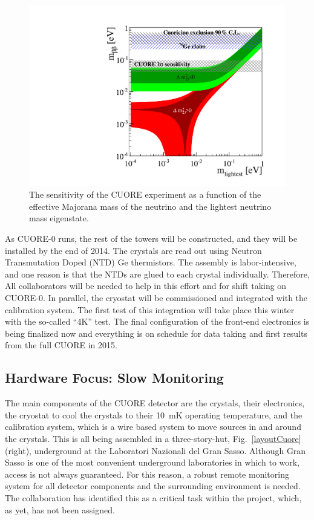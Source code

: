 \begin{figure}
\begin{center}
\includegraphics[width=0.45\columnwidth]{CUORE_Sensitivity.pdf} 
\end{center}
\caption{\label{sensCUORE}The sensitivity of the CUORE experiment as a function of the effective Majorana mass of the neutrino and the lightest neutrino mass eigenstate\cite{Alessandria:2011rc}. }
\end{figure}

As CUORE-0 runs, the rest of the towers will be constructed, and they will be installed by the end of 2014. The crystals are read out using Neutron Transmutation Doped (NTD) Ge thermistors. The assembly is labor-intensive, and one reason is that the NTDs are glued to each crystal individually. Therefore, All collaborators will be needed to help in this effort and for shift taking on CUORE-0. In parallel, the cryostat will be commissioned and integrated with the calibration system. The first test of this integration will take place this winter with the so-called ``4K'' test. The final configuration of the front-end electronics is being finalized now and everything is on schedule for data taking and first results from the full CUORE in 2015.

\subsection{Hardware Focus: Slow Monitoring}
The main components of the CUORE detector are the crystals, their electronics, the cryostat to cool the crystals to their 10~mK operating temperature, and the calibration system, which is a wire based system to move sources in and around the crystals. This is all being assembled in a three-story-hut,  Fig.~\ref{layoutCuore} (right), underground at the Laboratori Nazionali del Gran Sasso. Although Gran Sasso is one of the most convenient underground laboratories in which to work, access is not always guaranteed. For this reason, a robust remote monitoring system for all detector components and the surrounding environment is needed. The collaboration has identified this as a critical task within the project, which, as yet,  has not been assigned.

